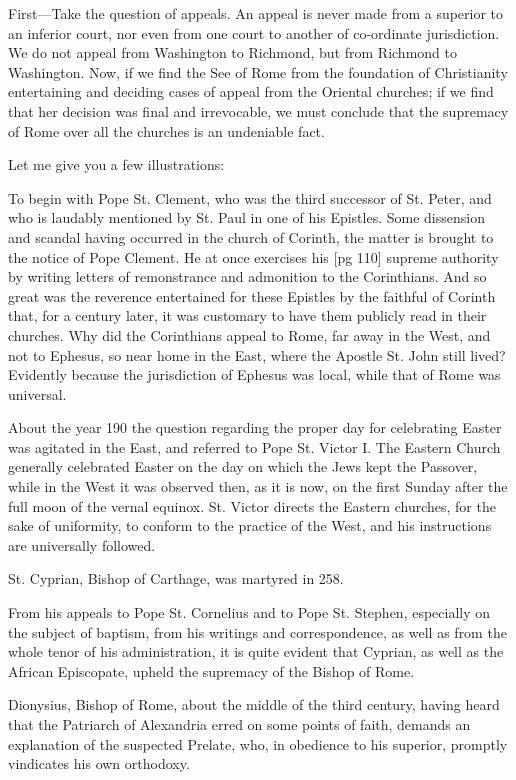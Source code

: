 First—Take the question of appeals. An appeal
is never made from a superior to an inferior court,
nor even from one court to another of co-ordinate
jurisdiction. We do not appeal from Washington
to Richmond, but from Richmond to Washington.
Now, if we find the See of Rome from the
foundation of Christianity entertaining and deciding
cases of appeal from the Oriental churches;
if we find that her decision was final and irrevocable,
we must conclude that the supremacy of Rome
over all the churches is an undeniable fact.

Let me give you a few illustrations:

To begin with Pope St. Clement, who was the
third successor of St. Peter, and who is laudably
mentioned by St. Paul in one of his Epistles. Some
dissension and scandal having occurred in the
church of Corinth, the matter is brought to the
notice of Pope Clement. He at once exercises his
[pg 110]
supreme authority by writing letters of remonstrance
and admonition to the Corinthians. And
so great was the reverence entertained for these
Epistles by the faithful of Corinth that, for a
century later, it was customary to have them publicly
read in their churches. Why did the Corinthians
appeal to Rome, far away in the West,
and not to Ephesus, so near home in the East,
where the Apostle St. John still lived? Evidently
because the jurisdiction of Ephesus was local,
while that of Rome was universal.

About the year 190 the question regarding the
proper day for celebrating Easter was agitated in
the East, and referred to Pope St. Victor I. The
Eastern Church generally celebrated Easter on
the day on which the Jews kept the Passover,
while in the West it was observed then, as it is
now, on the first Sunday after the full moon of
the vernal equinox. St. Victor directs the Eastern
churches, for the sake of uniformity, to conform
to the practice of the West, and his instructions
are universally followed.

St. Cyprian, Bishop of Carthage, was martyred
in 258.

From his appeals to Pope St. Cornelius and to
Pope St. Stephen, especially on the subject of baptism,
from his writings and correspondence, as well
as from the whole tenor of his administration, it is
quite evident that Cyprian, as well as the African
Episcopate, upheld the supremacy of the Bishop of
Rome.

Dionysius, Bishop of Rome, about the middle of
the third century, having heard that the Patriarch
of Alexandria erred on some points of faith, demands
an explanation of the suspected Prelate,
who, in obedience to his superior, promptly vindicates
his own orthodoxy.

